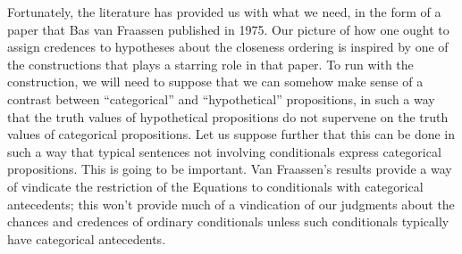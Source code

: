 \documentclass[If.tex]{subfiles}
\begin{document}
Fortunately, the literature has provided us with what we need, in the form of a paper that Bas van Fraassen published in 1975. Our picture of how one ought to assign credences to hypotheses about the closeness ordering is inspired by one of the constructions that plays a starring role in that paper. To run with the construction, we will need to suppose that we can somehow make sense of a contrast between “categorical” and “hypothetical” propositions, in such a way that the truth values of hypothetical propositions do not supervene on the truth values of categorical propositions. Let us suppose further that this can be done in such a way that typical sentences not involving conditionals express categorical propositions. This is going to be important. Van Fraassen's results provide a way of vindicate the restriction of the Equations to conditionals with categorical antecedents; this won't provide much of a vindication of our judgments about the chances and credences of ordinary conditionals unless such conditionals typically have categorical antecedents.
\end{document}
